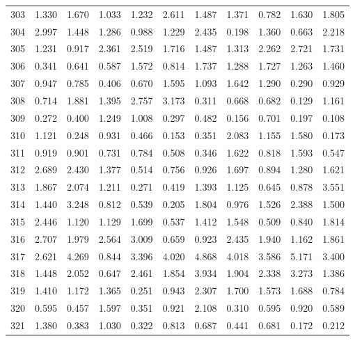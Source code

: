\begin{tabular}{lrrrrrrrrrr}
303 &  1.330 &  1.670 &  1.033 &  1.232 &  2.611 &  1.487 &  1.371 &  0.782 &  1.630 &  1.805 \\
304 &  2.997 &  1.448 &  1.286 &  0.988 &  1.229 &  2.435 &  0.198 &  1.360 &  0.663 &  2.218 \\
305 &  1.231 &  0.917 &  2.361 &  2.519 &  1.716 &  1.487 &  1.313 &  2.262 &  2.721 &  1.731 \\
306 &  0.341 &  0.641 &  0.587 &  1.572 &  0.814 &  1.737 &  1.288 &  1.727 &  1.263 &  1.460 \\
307 &  0.947 &  0.785 &  0.406 &  0.670 &  1.595 &  1.093 &  1.642 &  1.290 &  0.290 &  0.929 \\
308 &  0.714 &  1.881 &  1.395 &  2.757 &  3.173 &  0.311 &  0.668 &  0.682 &  0.129 &  1.161 \\
309 &  0.272 &  0.400 &  1.249 &  1.008 &  0.297 &  0.482 &  0.156 &  0.701 &  0.197 &  0.108 \\
310 &  1.121 &  0.248 &  0.931 &  0.466 &  0.153 &  0.351 &  2.083 &  1.155 &  1.580 &  0.173 \\
311 &  0.919 &  0.901 &  0.731 &  0.784 &  0.508 &  0.346 &  1.622 &  0.818 &  1.593 &  0.547 \\
312 &  2.689 &  2.430 &  1.377 &  0.514 &  0.756 &  0.926 &  1.697 &  0.894 &  1.280 &  1.621 \\
313 &  1.867 &  2.074 &  1.211 &  0.271 &  0.419 &  1.393 &  1.125 &  0.645 &  0.878 &  3.551 \\
314 &  1.440 &  3.248 &  0.812 &  0.539 &  0.205 &  1.804 &  0.976 &  1.526 &  2.388 &  1.500 \\
315 &  2.446 &  1.120 &  1.129 &  1.699 &  0.537 &  1.412 &  1.548 &  0.509 &  0.840 &  1.814 \\
316 &  2.707 &  1.979 &  2.564 &  3.009 &  0.659 &  0.923 &  2.435 &  1.940 &  1.162 &  1.861 \\
317 &  2.621 &  4.269 &  0.844 &  3.396 &  4.020 &  4.868 &  4.018 &  3.586 &  5.171 &  3.400 \\
318 &  1.448 &  2.052 &  0.647 &  2.461 &  1.854 &  3.934 &  1.904 &  2.338 &  3.273 &  1.386 \\
319 &  1.410 &  1.172 &  1.365 &  0.251 &  0.943 &  2.307 &  1.700 &  1.573 &  1.688 &  0.784 \\
320 &  0.595 &  0.457 &  1.597 &  0.351 &  0.921 &  2.108 &  0.310 &  0.595 &  0.920 &  0.589 \\
321 &  1.380 &  0.383 &  1.030 &  0.322 &  0.813 &  0.687 &  0.441 &  0.681 &  0.172 &  0.212 \\

\end{tabular}
